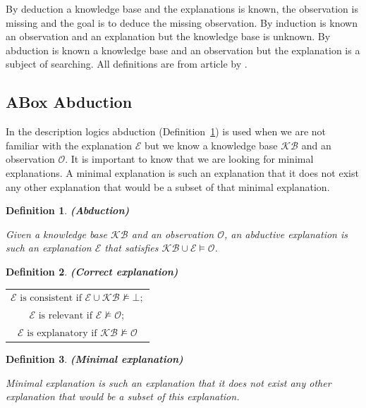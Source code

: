 \documentclass[12pt,a4paper]{article}
\newtheorem{definition}{Definition}[subsection]
\begin{document}
By deduction a knowledge base and the explanations is known, the observation is missing and the goal is to deduce the missing observation. By induction is known an observation and an explanation but the knowledge base is unknown. By abduction is known a knowledge base and an observation but the explanation is a subject of searching. All definitions are from article by \cite{pukancovaAboxAbduction}.

\subsection{ABox Abduction}
In the description logics abduction (Definition~\ref{def:abduction}) is used when we are not familiar with the explanation $\mathcal{E}$ but we know a knowledge base $\mathcal{KB}$ and an observation $\mathcal{O}$. It is important to know that we are looking for minimal explanations. A minimal explanation is such an explanation that it does not exist any other explanation that would be a subset of that minimal explanation.

\begin{definition}{\textbf{(Abduction)}} 
	\label{def:abduction}
		
	Given a knowledge base $\mathcal{KB}$ and an observation $\mathcal{O}$, an abductive explanation is such an explanation $\mathcal{E}$ that satisfies $\mathcal{KB} \cup \mathcal{E} \models \mathcal{O}$.
\end{definition}

\newpage
\begin{definition}{\textbf{(Correct explanation)}}
	\begin{table}[H]
		\centering
		\begin{tabular}{c}
			$\mathcal{E} \text{ is consistent if } \mathcal{E} \cup \mathcal{KB} \not \models \mathcal{\bot};$ \\
			\addlinespace[0.4cm]
			$\mathcal{E} \text{ is relevant if } \mathcal{E} \not \models \mathcal{O};$ \\
			\addlinespace[0.4cm]
			$\mathcal{E} \text{ is explanatory if } \mathcal{KB} \not \models \mathcal{O}$ \\
		\end{tabular}
	\end{table}
\end{definition}

\begin{definition}{\textbf{(Minimal explanation)}}
	
	Minimal explanation is such an explanation that it does not exist any other explanation that would be a subset of this explanation.
\end{definition}
\end{document}
